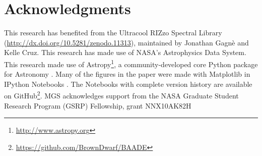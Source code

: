 \section{Acknowledgments}

This research has benefited from the Ultracool RIZzo Spectral Library (\url{http://dx.doi.org/10.5281/zenodo.11313}), maintained by Jonathan Gagn\`{e} and Kelle Cruz.  This research has made use of NASA's Astrophysics Data System.  This research made use of Astropy\footnote{\url{http://www.astropy.org}}, a community-developed core Python package for Astronomy \citep{2013A&A...558A..33A}.  Many of the figures in the paper were made with Matplotlib \citep{Hunter:2007} in IPython Notebooks \citep{PER-GRA:2007}.  The Notebooks with complete version history are available on GitHub\footnote{\url{https://github.com/BrownDwarf/BAADE}}.  MGS acknowledges support from the NASA Graduate Student Research Program (GSRP) Fellowship, grant NNX10AK82H
